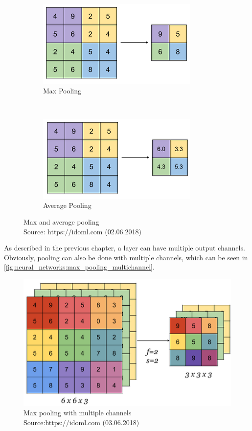 \begin{figure}[H]
    \centering
	\begin{subfigure}{0.4\textwidth}
    	\includegraphics[width=0.9\linewidth]{chapters/neural_networks/images/max_pooling.png}		    \caption{Max Pooling}
    	\label{fig:neural_networks:max_pooling}
	\end{subfigure}~
	\begin{subfigure}{0.4\textwidth}
    	\includegraphics[width=0.9\linewidth]{chapters/neural_networks/images/avg_pooling.png}       	\caption{Average Pooling}
    	\label{fig:neural_networks:avg_pooling}
	\end{subfigure}
	\caption{Max and average pooling\\Source: https://idoml.com (02.06.2018)}
	\label{fig:neural_networks:pooling}
\end{figure}

As described in the previous chapter, a layer can have multiple output channels. Obviously, pooling can also be done with multiple channels, which can be seen in \autoref{fig:neural_networks:max_pooling_multichannel}.

\begin{figure}[H]
    \centering
	\includegraphics[width=0.6\linewidth]{chapters/neural_networks/images/max_pooling_multichannel.png}
	\caption{Max pooling with multiple channels\\ Source:https://idoml.com (03.06.2018)}
	\label{fig:neural_networks:max_pooling_multichannel}
\end{figure}

